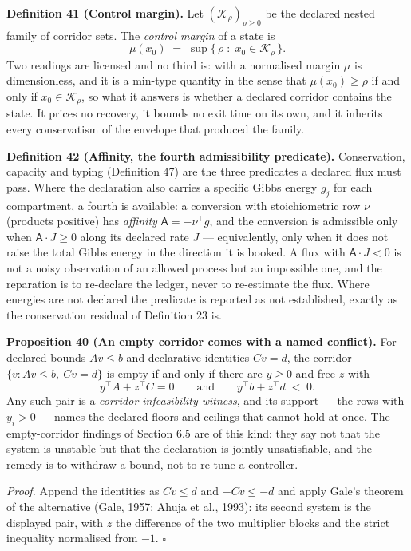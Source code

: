 \documentclass[11pt]{article}
\begin{document}
\textbf{Definition 41 (Control margin).} Let \((\mathcal K_\rho)_{\rho \ge 0}\) be the declared nested family of
corridor sets. The \emph{control margin} of a state is
\[ \mu(x_0) \;=\; \sup\{\, \rho \;:\; x_0 \in \mathcal K_\rho \,\}. \]
Two readings are licensed and no third is: with a normalised margin \(\mu\) is dimensionless, and it is a
min-type quantity in the sense that \(\mu(x_0) \ge \rho\) if and only if \(x_0 \in \mathcal K_\rho\), so what it
answers is whether a declared corridor contains the state. It prices no recovery, it bounds no exit time on
its own, and it inherits every conservatism of the envelope that produced the family.

\textbf{Definition 42 (Affinity, the fourth admissibility predicate).} Conservation, capacity and typing
(Definition 47) are the three predicates a declared flux must pass. Where the declaration also carries a specific Gibbs energy
\(g_j\) for each compartment, a fourth is available: a conversion with stoichiometric row \(\nu\) (products
positive) has \emph{affinity} \(\mathsf{A} = -\nu^{\top} g\), and the conversion is admissible only when
\(\mathsf{A} \cdot J \ge 0\) along its declared rate \(J\) --- equivalently, only when it does not raise the
total Gibbs energy in the direction it is booked. A flux with \(\mathsf{A} \cdot J < 0\) is not a noisy
observation of an allowed process but an impossible one, and the reparation is to re-declare the ledger,
never to re-estimate the flux. Where energies are not declared the predicate is reported as not
established, exactly as the conservation residual of Definition 23 is.

\textbf{Proposition 40 (An empty corridor comes with a named conflict).} For declared bounds \(A v \le b\) and
declarative identities \(C v = d\), the corridor \(\{v : A v \le b,\ C v = d\}\) is empty if and only if there
are \(y \ge 0\) and free \(z\) with
\[
y^{\top} A + z^{\top} C = 0 \qquad \text{and} \qquad y^{\top} b + z^{\top} d \;<\; 0 .
\]
Any such pair is a \emph{corridor-infeasibility witness}, and its support --- the rows with \(y_i > 0\) --- names
the declared floors and ceilings that cannot hold at once. The empty-corridor findings of Section 6.5 are of
this kind: they say not that the system is unstable but that the declaration is jointly unsatisfiable, and
the remedy is to withdraw a bound, not to re-tune a controller.

\emph{Proof.} Append the identities as \(C v \le d\) and \(-C v \le -d\) and apply Gale's theorem of the
alternative (Gale, 1957; Ahuja et al., 1993): its second system is the displayed pair, with \(z\) the
difference of the two multiplier blocks and the strict inequality normalised from \(-1\). \ensuremath{\square}
\end{document}
